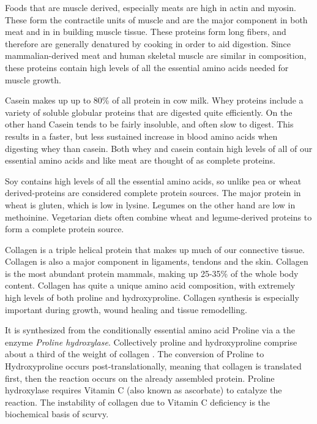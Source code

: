 \documentclass{tufte-handout}
\begin{document}
  Foods that are muscle derived, especially meats are high in actin and myosin.  These form the contractile units of muscle and are the major component in both meat and in in building muscle tissue.  These proteins form long fibers, and therefore are generally denatured by cooking in order to aid digestion.  Since mammalian-derived meat and human skeletal muscle are similar in composition, these proteins contain high levels of all the essential amino acids needed for muscle growth.

  Casein makes up up to 80\% of all protein in cow milk.  Whey proteins include a variety of soluble globular proteins that are digested quite efficiently.  On the other hand Casein tends to be fairly insoluble, and often slow to digest.  This results in a faster, but less sustained increase in blood amino acids when digesting whey than casein.   Both whey and casein contain high levels of all of our essential amino acids and like meat are thought of as complete proteins.

  Soy contains high levels of all the essential amino acids, so unlike pea or wheat derived-proteins are considered complete protein sources.  The major protein in wheat is gluten, which is low in lysine.  Legumes on the other hand are low in methoinine.  Vegetarian diets often combine wheat and legume-derived proteins to form a complete protein source.

Collagen is a triple helical protein that makes up much of our connective tissue.  Collagen is also a major component in ligaments, tendons and the skin.  Collagen is the most abundant protein mammals, making up 25-35\% of the whole body content.  Collagen has quite a unique amino acid composition, with extremely high levels of both proline and hydroxyproline.  Collagen synthesis is especially important during growth, wound healing and tissue remodelling.

  It is synthesized from the conditionally essential amino acid Proline via a the enzyme \emph{Proline hydroxylase}.  Collectively proline and hydroxyproline comprise about a third of the weight of collagen \citep{Bowes1948}.  The conversion of Proline to Hydroxyproline occurs post-translationally, meaning that collagen is translated first, then the reaction occurs on the already assembled protein.  Proline hydroxylase requires Vitamin C (also known as ascorbate) to catalyze the reaction.  The instability of collagen due to Vitamin C deficiency is the biochemical basis of scurvy\cite{Lind1753}. 
\end{document}
